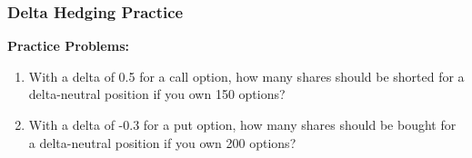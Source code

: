 \documentclass{beamer}
\begin{document}
\begin{frame}
\frametitle{Delta Hedging Practice}

\textbf{Practice Problems:}
\begin{enumerate}
  \item With a delta of 0.5 for a call option, how many shares should be shorted for a delta-neutral position if you own 150 options?
  \item With a delta of -0.3 for a put option, how many shares should be bought for a delta-neutral position if you own 200 options?
\end{enumerate}
\end{frame}
\end{document}
